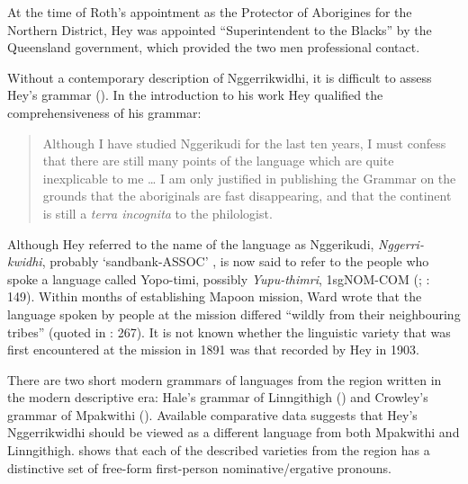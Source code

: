 At the time of Roth’s appointment as the Protector of Aborigines for the Northern District, Hey was appointed “Superintendent to the Blacks” by the Queensland government, which provided the two men professional contact.

Without a contemporary description of Nggerrikwidhi, it is difficult to assess Hey’s grammar (). In the introduction to his work Hey qualified the comprehensiveness of his grammar:

\begin{quote}
Although I have studied Nggerikudi for the last ten years, I must confess that there are still many points of the language which are quite inexplicable to me … I am only justified in publishing the Grammar on the grounds that the aboriginals are fast disappearing, and that the continent is still a \textit{terra incognita} to the philologist. \citep[2]{hey_elementary_1903}
\end{quote}

{Although Hey referred to the name of the language as Nggerikudi, \textit{Nggerri-kwidhi}, probably `sandbank-ASSOC' \citep[137]{breen_we_2008}, is now said to refer to the people who spoke a language called Yopo-timi, possibly \textit{Yupu-thimri}, 1sgNOM-COM (\citealt[137]{breen_we_2008}; \citealt{crowley_mpakwithi_1981}: 149). Within months of establishing Mapoon mission, Ward wrote that the language spoken by people at the mission differed “wildly from their neighbouring tribes” (quoted in \citealt{edwards_moravian_2007}: 267). It is not known whether the linguistic variety that was first encountered at the mission in 1891 was that recorded by Hey in 1903.}

There are two short modern grammars of languages from the region written in the modern descriptive era: Hale’s grammar of Linngithigh (\citeyear{hale_linngithigh_1966}) and Crowley’s grammar of Mpakwithi (\citeyear{crowley_mpakwithi_1981}). Available comparative data suggests that Hey’s Nggerrikwidhi should be viewed as a different language from both Mpakwithi and Linngithigh.  shows that each of the described varieties from the region has a distinctive set of free-form first-person nominative/ergative pronouns.


